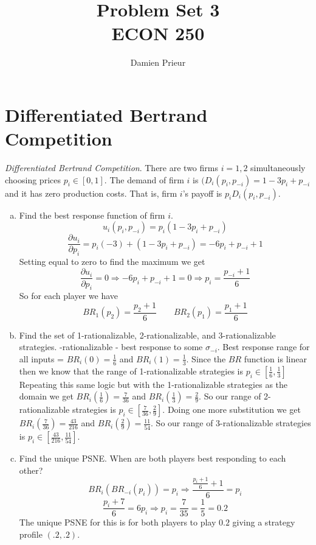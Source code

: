 \documentclass{article}
\author{Damien Prieur}
\title{Problem Set 3 \\ ECON 250}
\date{}
\begin{document}
\maketitle

\section{Differentiated Bertrand Competition}
\emph{Differentiated Bertrand Competition}.
There are two firms $i = 1, 2$ simultaneously choosing prices $p_{i} \in [0,1]$.
The demand of firm $i$ is $(D_{i}(p_{i},p_{-i})= 1-3p_{i} + p_{-i}$ and it has zero production costs.
That is, firm $i$'s payoff is $p_{i}D_{i}(p_{i},p_{-i})$.

\begin{enumerate}[(a)]

\item Find the best response function of firm $i$.
\newline
$$u_{i}(p_{i},p_{-i}) = p_{i} ( 1 - 3p_{i} + p_{-i})$$
$$\frac{\partial u_{i}}{\partial p_{i}} = p_{i}(-3) + (1-3p_{i}+p_{-i}) = -6p_{i} + p_{-i} + 1$$
Setting equal to zero to find the maximum we get
$$ \frac{\partial u_{i}}{\partial p_{i}} = 0 \Rightarrow -6p_{i} + p_{-i} + 1 = 0 \Rightarrow p_{i} = \frac{p_{-i} + 1}{6}$$
So for each player we have
$$ BR_{1}(p_2) = \frac{p_2+1}{6} \qquad BR_{2}(p_1) = \frac{p_1+1}{6}$$

\item Find the set of 1-rationalizable, 2-rationalizable, and 3-rationalizable strategies.
-rationalizable - best response to some $\sigma_{-i}$.
Best response range for all inputs = $BR_{i}(0) = \frac{1}{6}$ and $BR_{i}(1) = \frac{1}{3}$.
Since the $BR$ function is linear then we know that the range of 1-rationalizable strategies is $p_{i}\in[\frac{1}{6}, \frac{1}{3}]$
\newline
Repeating this same logic but with the 1-rationalizable strategies as the domain we get $BR_{i}(\frac{1}{6}) = \frac{7}{36}$ and $BR_{i}(\frac{1}{3}) = \frac{2}{9}$.
So our range of 2-rationalizable strategies is $p_{i} \in [\frac{7}{36},\frac{2}{9}]$.
\newline
Doing one more substitution we get $BR_{i}(\frac{7}{36}) = \frac{43}{216}$ and $BR_{i}(\frac{2}{9}) = \frac{11}{54}$.
So our range of 3-rationalizable strategies is $p_{i} \in [\frac{43}{216},\frac{11}{54}]$.

\item Find the unique PSNE.
\newline
When are both players best responding to each other? \\
$$ BR_{i}(BR_{-i}(p_{i})) = p_{i} \Rightarrow \frac{\frac{p_{i} + 1}{6} + 1}{6} = p_{i} $$
$$\frac{p_{i} + 7}{6} = 6p_{i} \Rightarrow p_{i} = \frac{7}{35} = \frac{1}{5} = 0.2$$
The unique PSNE for this is for both players to play $0.2$ giving a strategy profile $(.2,.2)$.
\end{enumerate}
\end{document}
